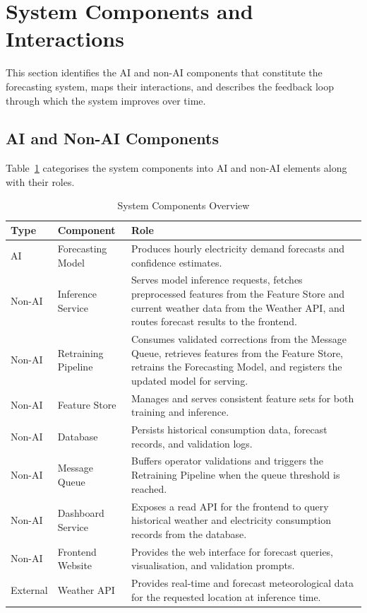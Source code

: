 \documentclass[12pt, a4paper]{report}
\begin{document}
\section{System Components and Interactions}

This section identifies the AI and non-AI components that constitute the forecasting system, maps their interactions, and describes the feedback loop through which the system improves over time.

\subsection{AI and Non-AI Components}
Table~\ref{tab:system-components} categorises the system components into AI and non-AI elements along with their roles.

\begin{table}[!h]
    \centering
    \caption{System Components Overview}
    \begin{tabular}{p{1.5cm}|p{3.5cm}|p{9.5cm}}
        \toprule
        \textbf{Type} & \textbf{Component} & \textbf{Role} \\
        \hline
        AI & Forecasting Model & Produces hourly electricity demand forecasts and confidence estimates. \\
        \hline
        Non-AI & Inference Service & Serves model inference requests, fetches preprocessed features from the Feature Store and current weather data from the Weather API, and routes forecast results to the frontend. \\
        \hline
        Non-AI & Retraining Pipeline & Consumes validated corrections from the Message Queue, retrieves features from the Feature Store, retrains the Forecasting Model, and registers the updated model for serving. \\
        \hline
        Non-AI & Feature Store & Manages and serves consistent feature sets for both training and inference. \\
        \hline
        Non-AI & Database & Persists historical consumption data, forecast records, and validation logs. \\
        \hline
        Non-AI & Message Queue & Buffers operator validations and triggers the Retraining Pipeline when the queue threshold is reached. \\
        \hline
        Non-AI & Dashboard Service & Exposes a read API for the frontend to query historical weather and electricity consumption records from the database. \\
        \hline
        Non-AI & Frontend Website & Provides the web interface for forecast queries, visualisation, and validation prompts. \\
        \hline
        External & Weather API & Provides real-time and forecast meteorological data for the requested location at inference time. \\
        \bottomrule
    \end{tabular}
    \label{tab:system-components}
\end{table}
\end{document}
